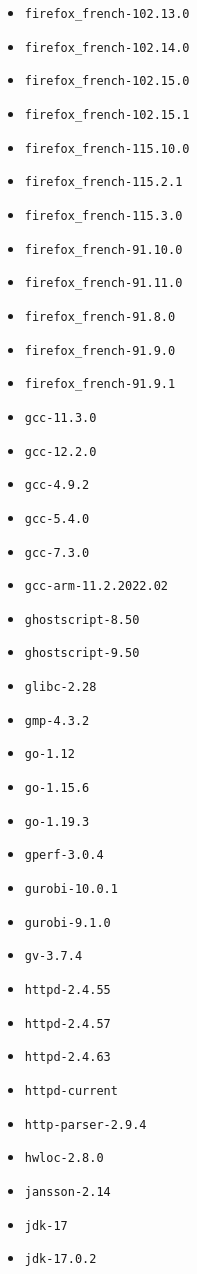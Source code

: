 \begin{multicols}{3}
\begin{itemize}
\item \verb|firefox_french-102.13.0|
\item \verb|firefox_french-102.14.0|
\item \verb|firefox_french-102.15.0|
\item \verb|firefox_french-102.15.1|
\item \verb|firefox_french-115.10.0|
\item \verb|firefox_french-115.2.1|
\item \verb|firefox_french-115.3.0|
\item \verb|firefox_french-91.10.0|
\item \verb|firefox_french-91.11.0|
\item \verb|firefox_french-91.8.0|
\item \verb|firefox_french-91.9.0|
\item \verb|firefox_french-91.9.1|
\item \verb|gcc-11.3.0|
\item \verb|gcc-12.2.0|
\item \verb|gcc-4.9.2|
\item \verb|gcc-5.4.0|
\item \verb|gcc-7.3.0|
\item \verb|gcc-arm-11.2.2022.02|
\item \verb|ghostscript-8.50|
\item \verb|ghostscript-9.50|
\item \verb|glibc-2.28|
\item \verb|gmp-4.3.2|
\item \verb|go-1.12|
\item \verb|go-1.15.6|
\item \verb|go-1.19.3|
\item \verb|gperf-3.0.4|
\item \verb|gurobi-10.0.1|
\item \verb|gurobi-9.1.0|
\item \verb|gv-3.7.4|
\item \verb|httpd-2.4.55|
\item \verb|httpd-2.4.57|
\item \verb|httpd-2.4.63|
\item \verb|httpd-current|
\item \verb|http-parser-2.9.4|
\item \verb|hwloc-2.8.0|
\item \verb|jansson-2.14|
\item \verb|jdk-17|
\item \verb|jdk-17.0.2|

\end{itemize}
\end{multicols}
